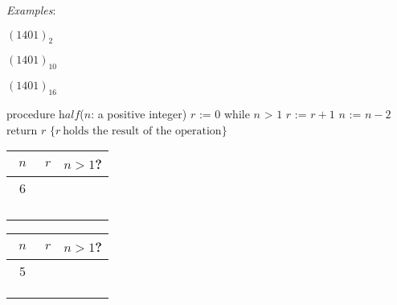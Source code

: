 \documentclass[12pt, oneside]{article}
\begin{document}

{\it Examples}:

$(1401)_{2}$

\vfill

$(1401)_{10}$

\vfill
\vfill
\vfill


$(1401)_{16}$

\vfill
\vfill
\vfill
 


\begin{algorithm}[caption={Algorithm for calculating integer part of half the input}]
    procedure $\textit{half}$($n$: a positive integer)
    $r$ := $0$
    while $n$ > $1$
      $r$ := $r + 1$
      $n$ := $n - 2$
    return $r$ $\{ r~\textrm{holds the result of the operation}\} $
    \end{algorithm}

 \begin{multicols}{2}
  \begin{center} 
    \begin{tabular}{c|c|c}
    $n$ & $r$  & $n > 1$?\\
    \hline 
    ~$6$~ & \phantom{~$0$~} & \phantom{~T~}\\
    \phantom{$4$} & \phantom{$1$} & \phantom{T}\\
    \phantom{$2$} & \phantom{$2$} & \phantom{T}\\
    \phantom{$0$} & \phantom{$3$} & \phantom{F}\\
    &\\
    \end{tabular}
    \end{center}
    \begin{center}
      \begin{tabular}{c|c|c}
      $n$ & $r$  & $n > 1$?\\
      \hline 
      ~$5$~ & \phantom{~$0$~} & \phantom{~T~}\\
      \phantom{$3$} & \phantom{$1$} & \phantom{T}\\
      \phantom{$1$} & \phantom{$2$} & \phantom{F}\\
      &\\
      \end{tabular}
      \end{center}    
\end{multicols}
\end{document}
